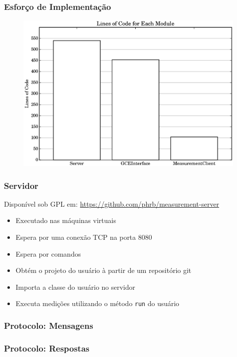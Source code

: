 \documentclass[10pt, compress]{beamer}
\begin{document}
\begin{frame}[fragile]
  \frametitle{Esforço de Implementação}
  \begin{figure}[H]
      \centering
      \includegraphics[width=1\textwidth]{loc_comparison}
  \end{figure}
\end{frame}

\begin{frame}[fragile]
    \frametitle{Servidor}
    Disponível sob GPL em:
    \url{https://github.com/phrb/measurement-server}
    \begin{itemize}
        \item Executado nas \alert{máquinas virtuais}
        \item Espera por uma \alert{conexão} TCP na porta 8080
        \item Espera por \alert{comandos}
        \item \alert{Obtém} o projeto do usuário à partir
            de um \alert{repositório git}
        \item \alert{Importa a classe} do usuário no servidor
        \item \alert{Executa medições} utilizando o método
            \texttt{run} do usuário
    \end{itemize}
\end{frame}

\begin{frame}[fragile]
  \frametitle{Protocolo: Mensagens}
  
\end{frame}

\begin{frame}[fragile]
  \frametitle{Protocolo: Respostas}
  
\end{frame}
\end{document}
